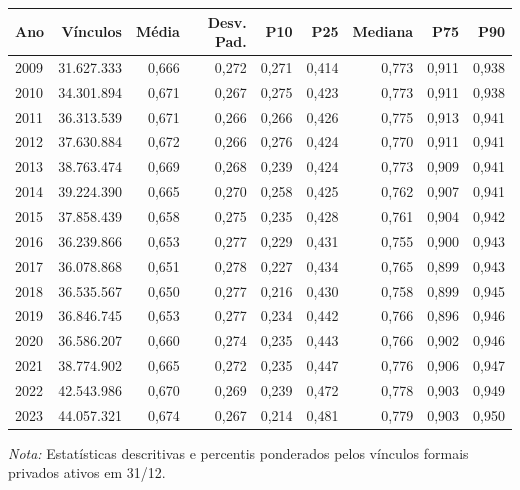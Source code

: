 \providecommand{\toprule}{\hline\hline}
\providecommand{\midrule}{\hline}
\providecommand{\bottomrule}{\hline\hline}
\providecommand{\addlinespace}[1][]{}
{\small
\renewcommand{\arraystretch}{1.12}
\begin{tabular}{lrrrrrrrr}
\toprule
Ano & Vínculos & Média & Desv. Pad. & P10 & P25 & Mediana & P75 & P90 \\
\midrule
2009 & 31.627.333 & 0,666 & 0,272 & 0,271 & 0,414 & 0,773 & 0,911 & 0,938 \\
2010 & 34.301.894 & 0,671 & 0,267 & 0,275 & 0,423 & 0,773 & 0,911 & 0,938 \\
2011 & 36.313.539 & 0,671 & 0,266 & 0,266 & 0,426 & 0,775 & 0,913 & 0,941 \\
2012 & 37.630.884 & 0,672 & 0,266 & 0,276 & 0,424 & 0,770 & 0,911 & 0,941 \\
2013 & 38.763.474 & 0,669 & 0,268 & 0,239 & 0,424 & 0,773 & 0,909 & 0,941 \\
2014 & 39.224.390 & 0,665 & 0,270 & 0,258 & 0,425 & 0,762 & 0,907 & 0,941 \\
2015 & 37.858.439 & 0,658 & 0,275 & 0,235 & 0,428 & 0,761 & 0,904 & 0,942 \\
2016 & 36.239.866 & 0,653 & 0,277 & 0,229 & 0,431 & 0,755 & 0,900 & 0,943 \\
2017 & 36.078.868 & 0,651 & 0,278 & 0,227 & 0,434 & 0,765 & 0,899 & 0,943 \\
2018 & 36.535.567 & 0,650 & 0,277 & 0,216 & 0,430 & 0,758 & 0,899 & 0,945 \\
2019 & 36.846.745 & 0,653 & 0,277 & 0,234 & 0,442 & 0,766 & 0,896 & 0,946 \\
2020 & 36.586.207 & 0,660 & 0,274 & 0,235 & 0,443 & 0,766 & 0,902 & 0,946 \\
2021 & 38.774.902 & 0,665 & 0,272 & 0,235 & 0,447 & 0,776 & 0,906 & 0,947 \\
2022 & 42.543.986 & 0,670 & 0,269 & 0,239 & 0,472 & 0,778 & 0,903 & 0,949 \\
2023 & 44.057.321 & 0,674 & 0,267 & 0,214 & 0,481 & 0,779 & 0,903 & 0,950 \\
\bottomrule
\end{tabular}
\vspace{2pt}
\par{\footnotesize \textit{Nota:} Estatísticas descritivas e percentis ponderados pelos vínculos formais privados ativos em 31/12.}
}
